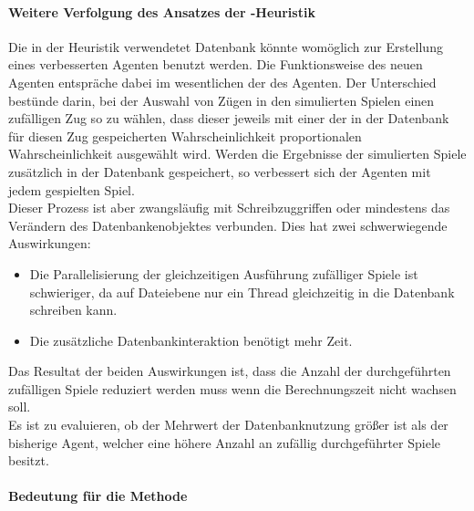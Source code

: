 \paragraph{Weitere Verfolgung des Ansatzes der -Heuristik}
Die in der  Heuristik verwendetet Datenbank könnte womöglich zur Erstellung eines verbesserten Agenten benutzt werden. Die Funktionsweise des neuen Agenten entspräche dabei im wesentlichen der des  Agenten. Der Unterschied bestünde darin, bei der Auswahl von Zügen in den simulierten Spielen einen zufälligen Zug so zu wählen, dass dieser jeweils mit einer der in der Datenbank für diesen Zug gespeicherten Wahrscheinlichkeit proportionalen Wahrscheinlichkeit ausgewählt wird. Werden die Ergebnisse der simulierten Spiele zusätzlich in der Datenbank gespeichert, so verbessert sich der Agenten mit jedem gespielten Spiel.
\\Dieser Prozess ist aber zwangsläufig mit Schreibzuggriffen oder mindestens das Verändern des Datenbankenobjektes verbunden. Dies hat zwei schwerwiegende Auswirkungen:
\begin{itemize}
\item Die Parallelisierung der gleichzeitigen Ausführung zufälliger Spiele ist schwieriger, da auf Dateiebene nur ein Thread gleichzeitig in die Datenbank schreiben kann.
\item Die zusätzliche Datenbankinteraktion benötigt mehr Zeit.
\end{itemize}
Das Resultat der beiden Auswirkungen ist, dass die Anzahl der durchgeführten zufälligen Spiele reduziert werden muss wenn die Berechnungszeit nicht wachsen soll.
\\Es ist zu evaluieren, ob der Mehrwert der Datenbanknutzung größer ist als der bisherige  Agent, welcher eine höhere Anzahl an zufällig durchgeführter Spiele besitzt.
\paragraph{Bedeutung für die Methode}

